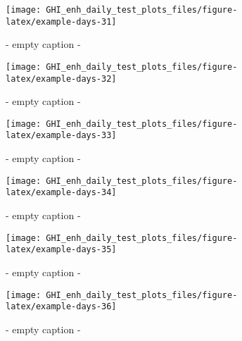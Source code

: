 \documentclass[
  10pt,
  a4paper,oneside]{article}
\begin{document}
\begin{figure}[H]

{\centering \texttt{[image: GHI\_enh\_daily\_test\_plots\_files/figure-latex/example-days-31]} 

}

\caption{ - empty caption - }\label{fig:example-days-31}
\end{figure}

\begin{figure}[H]

{\centering \texttt{[image: GHI\_enh\_daily\_test\_plots\_files/figure-latex/example-days-32]} 

}

\caption{ - empty caption - }\label{fig:example-days-32}
\end{figure}

\begin{figure}[H]

{\centering \texttt{[image: GHI\_enh\_daily\_test\_plots\_files/figure-latex/example-days-33]} 

}

\caption{ - empty caption - }\label{fig:example-days-33}
\end{figure}

\begin{figure}[H]

{\centering \texttt{[image: GHI\_enh\_daily\_test\_plots\_files/figure-latex/example-days-34]} 

}

\caption{ - empty caption - }\label{fig:example-days-34}
\end{figure}

\begin{figure}[H]

{\centering \texttt{[image: GHI\_enh\_daily\_test\_plots\_files/figure-latex/example-days-35]} 

}

\caption{ - empty caption - }\label{fig:example-days-35}
\end{figure}

\begin{figure}[H]

{\centering \texttt{[image: GHI\_enh\_daily\_test\_plots\_files/figure-latex/example-days-36]} 

}

\caption{ - empty caption - }\label{fig:example-days-36}
\end{figure}
\end{document}
